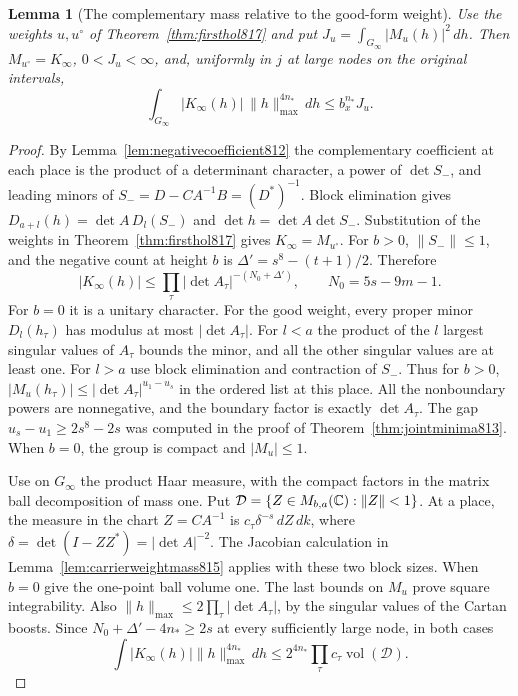 \documentclass[a4paper,11pt]{article}
\newtheorem{lemma}[proposition]{Lemma}
\theoremstyle{definition}
\theoremstyle{remark}
\numberwithin{equation}{section}
\begin{document}
\begin{lemma}[The complementary mass relative to the good-form weight]
\leavevmode\label{lem:flagmass818}
Use the weights \(u,u^\circ\) of Theorem~\ref{thm:firsthol817}
and put \(J_u=\int_{G_\infty}|M_u(h)|^2\,dh\). Then
\(M_{u^\circ}=K_\infty\), \(0<J_u<\infty\), and, uniformly
in \(j\) at large nodes on the original intervals,
\[
    \int_{G_\infty}|K_\infty(h)|\,\|h\|_{\max}^{4n_*}\,dh
                   \le b_x^{n_*}J_u .
\]
\end{lemma}
\begin{proof}
By Lemma~\ref{lem:negativecoefficient812} the complementary
coefficient at each place is the product of a determinant
character, a power of \(\det S_-\), and leading minors of
\(S_-=D-CA^{-1}B=(D^*)^{-1}\). Block elimination gives
\(D_{a+l}(h)=\det A\,D_l(S_-)\) and
\(\det h=\det A\det S_-\). Substitution of the weights
in Theorem~\ref{thm:firsthol817} gives \(K_\infty=M_{u^\circ}\).
For \(b>0\), \(\|S_-\|\le1\), and the negative count
at height \(b\) is \(\Delta'=s^8-(t+1)/2\). Therefore
\[
   |K_\infty(h)|\le\prod_\tau|\det A_\tau|^{-(N_0+\Delta')},
   \qquad N_0=5s-9m-1 .
\]
For \(b=0\) it is a unitary character. For the good
weight, every proper minor \(D_l(h_\tau)\) has modulus
at most \(|\det A_\tau|\). For \(l<a\) the product of
the \(l\) largest singular values of \(A_\tau\) bounds
the minor, and all the other singular values are at least
one. For \(l>a\) use block elimination and contraction
of \(S_-\). Thus for \(b>0\),
\(|M_u(h_\tau)|\le|\det A_\tau|^{u_1-u_s}\) in the ordered
list at this place. All the nonboundary powers are
nonnegative, and the boundary factor is exactly \(\det A_\tau\).
The gap \(u_s-u_1\ge2s^8-2s\) was computed in the proof
of Theorem~\ref{thm:jointminima813}. When \(b=0\), the
group is compact and \(|M_u|\le1\).

Use on \(G_\infty\) the product Haar measure, with the
compact factors in the matrix ball decomposition of mass
one. Put \(\mathcal D=\{Z\in M_{b,a}(\mathbb C):\|Z\|<1\}\).
At a place, the measure in the chart \(Z=CA^{-1}\) is
\(c_\tau\delta^{-s}\,dZ\,dk\), where
\(\delta=\det(I-ZZ^*)=|\det A|^{-2}\). The Jacobian
calculation in Lemma~\ref{lem:carrierweightmass815} applies
with these two block sizes. When \(b=0\) give the one-point
ball volume one. The last bounds on \(M_u\) prove
square integrability. Also
\(\|h\|_{\max}\le2\prod_\tau|\det A_\tau|\), by the singular
values of the Cartan boosts. Since \(N_0+\Delta'-4n_*\ge2s\)
at every sufficiently large node, in both cases
\[
    \int |K_\infty(h)|\|h\|_{\max}^{4n_*}\,dh
         \le 2^{4n_*}\prod_\tau c_\tau\operatorname{vol}(\mathcal D).
\]


\end{proof}
\end{document}
